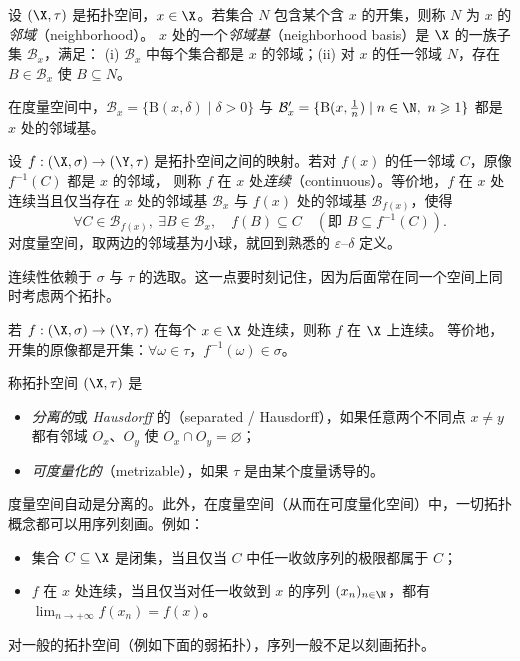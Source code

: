 \begin{definition}[邻域]
\label{def:29}
设 $(\X,\tau)$ 是拓扑空间，$x\in\X$。若集合 $N$ 包含某个含 $x$ 的开集，则称 $N$ 为 $x$ 的\emph{邻域}（neighborhood）。
$x$ 处的一个\emph{邻域基}（neighborhood basis）是 $\X$ 的一族子集 $\mathcal{B}_x$，满足：
(i) $\mathcal{B}_x$ 中每个集合都是 $x$ 的邻域；(ii) 对 $x$ 的任一邻域 $N$，存在 $B\in\mathcal{B}_x$ 使 $B\subseteq N$。
\end{definition}

\begin{example}
\label{exa:27}
在度量空间中，$\mathcal{B}_x=\{\mathrm{B}(x,\delta)\mid\delta>0\}$ 与 $\mathcal{B}'_x=\{\mathrm{B}(x,\tfrac1n)\mid n\in\N,\ n\geqslant 1\}$
都是 $x$ 处的邻域基。
\end{example}

\begin{definition}[一点处连续]
\label{def:30}
设 $f:(\X,\sigma)\to(\Y,\tau)$ 是拓扑空间之间的映射。若对 $f(x)$ 的任一邻域 $C$，原像 $f^{-1}(C)$ 都是 $x$ 的邻域，
则称 $f$ 在 $x$ 处\emph{连续}（continuous）。等价地，$f$ 在 $x$ 处连续当且仅当存在 $x$ 处的邻域基 $\mathcal{B}_x$
与 $f(x)$ 处的邻域基 $\mathcal{B}_{f(x)}$，使得
\[
  \forall C\in\mathcal{B}_{f(x)},\ \exists B\in\mathcal{B}_x,\quad f(B)\subseteq C\quad(\text{即 } B\subseteq f^{-1}(C)).
\]
对度量空间，取两边的邻域基为小球，就回到熟悉的 $\varepsilon$--$\delta$ 定义。
\end{definition}

连续性依赖于 $\sigma$ 与 $\tau$ 的选取。这一点要时刻记住，因为后面常在同一个空间上同时考虑两个拓扑。

\begin{definition}[连续]
\label{def:31}
若 $f:(\X,\sigma)\to(\Y,\tau)$ 在每个 $x\in\X$ 处连续，则称 $f$ 在 $\X$ 上连续。
等价地，开集的原像都是开集：$\forall\omega\in\tau$，$f^{-1}(\omega)\in\sigma$。
\end{definition}

\begin{definition}
\label{def:32}
称拓扑空间 $(\X,\tau)$ 是
\begin{itemize}
  \item \emph{分离的}或 \emph{Hausdorff} 的（separated / Hausdorff），如果任意两个不同点 $x\neq y$ 都有邻域 $O_x$、$O_y$ 使 $O_x\cap O_y=\varnothing$；
  \item \emph{可度量化的}（metrizable），如果 $\tau$ 是由某个度量诱导的。
\end{itemize}
\end{definition}

\begin{remark}
\label{rem:24}
度量空间自动是分离的。此外，在度量空间（从而在可度量化空间）中，一切拓扑概念都可以用序列刻画。例如：
\begin{itemize}
  \item 集合 $C\subseteq\X$ 是闭集，当且仅当 $C$ 中任一收敛序列的极限都属于 $C$；
  \item $f$ 在 $x$ 处连续，当且仅当对任一收敛到 $x$ 的序列 $(x_n)_{n\in\N}$，都有 $\lim_{n\to+\infty}f(x_n)=f(x)$。
\end{itemize}
对一般的拓扑空间（例如下面的弱拓扑），序列一般不足以刻画拓扑。
\end{remark}

